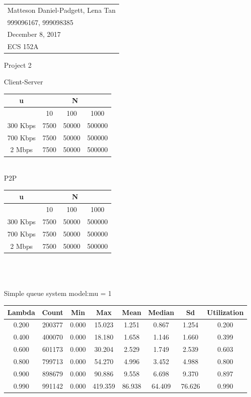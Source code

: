 \documentclass{article}
\begin{document}
	\null\hfill\begin{tabular}[t]{l@{}}
	Matteson Daniel-Padgett, Lena Tan\\
	999096167, 999098385\\
	December 8, 2017\\
	ECS 152A
\end{tabular}
	
\begin{center}	
\sc \Large Project 2
\end{center}	

\noindent Client-Server\\
\begin{tabular}{|c | c | c | c|}
	\hline
	u & \multicolumn{3}{|c|}{N} \\
	\hline
	 & 10 & 100 & 1000 \\
	\hline
	300 Kbps & 7500 & 50000 & 500000 \\
	\hline
	700 Kbps & 7500 & 50000 & 500000 \\
	\hline
	2 Mbps & 7500 & 50000 & 500000 \\
	\hline
\end{tabular} \\

\noindent P2P\\
\begin{tabular}{|c | c | c | c|}
	\hline
	u & \multicolumn{3}{|c|}{N} \\
	\hline
	& 10 & 100 & 1000 \\
	\hline
	300 Kbps & 7500 & 50000 & 500000 \\
	\hline
	700 Kbps & 7500 & 50000 & 500000 \\
	\hline
	2 Mbps & 7500 & 50000 & 500000 \\
	\hline
\end{tabular} \\

\part{}	
	
\section{}
Simple queue system model:mu = 1 \\
\begin{tabular}{c | c | c | c | c | c | c | c}
	Lambda & Count & Min & Max & Mean & Median & Sd & Utilization \\
	\hline
	0.200 & 200377 & 0.000 & 15.023 & 1.251 & 0.867 & 1.254 & 0.200 \\ 
	0.400 & 400070 & 0.000 & 18.180 & 1.658 & 1.146 & 1.660 & 0.399 \\ 
	0.600 & 601173 & 0.000 & 30.204 & 2.529 & 1.749 & 2.539 & 0.603 \\ 
	0.800 & 799713 & 0.000 & 54.270 & 4.996 & 3.452 & 4.988 & 0.800 \\ 
	0.900 & 898679 & 0.000 & 90.886 & 9.558 & 6.698 & 9.370 & 0.897 \\
	0.990 & 991142 & 0.000 & 419.359 & 86.938 & 64.409 & 76.626 & 0.990 \\
\end{tabular} \\
\end{document}
